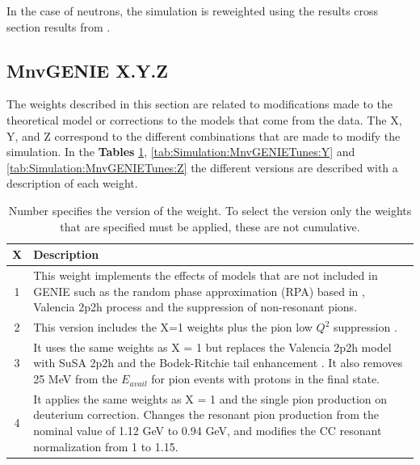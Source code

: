 In the case of neutrons, the simulation is reweighted using the results cross section results from \cite{ElkinsNeutronsPhysRevD.100.052002}.

\subsection{MnvGENIE X.Y.Z}
\label{Cap:Simulation:MnvGENIETunes:MnvTunesXYZ}
The weights described in this section are related to modifications made to the theoretical model or corrections to the models that come from the data. The X, Y, and Z correspond to the different combinations that are made to modify the simulation. 
In the \textbf{Tables} \ref{tab:Simulation:MnvGENIETunes:X}, \ref{tab:Simulation:MnvGENIETunes:Y} and \ref{tab:Simulation:MnvGENIETunes:Z} the different versions are described with a description of each weight. 

\begin{table}[!htb]
    \centering
    \begin{tabular}{c|p{4.5in}}
        \textbf{X} & \textbf{Description} \\ \hline
        1 & This weight implements the effects of models that are not included in GENIE such as the random phase approximation (RPA) based in \cite{RPAPhysRevC.70.055503}\cite{RPAgran2017model}, Valencia 2p2h process \cite{2p2hPhysRevC.83.045501}\cite{2p2hGran_2013}\cite{2p2hRodrigues_2016} and the suppression of non-resonant pions\cite{Rodrigues_2016}. \\ \hline
        2 & This version includes the X=1 weights plus the pion low $Q^2$ suppression \cite{LowQ2PhysRevD.100.072005}.  \\ \hline
        3 & It uses the same weights as X = 1 but replaces the Valencia 2p2h model with SuSA 2p2h \cite{SuSAPhysRevC.38.1801} and the Bodek-Ritchie tail enhancement \cite{Alvarez_Ruso_2021}. It also removes 25 MeV from the $E_{avail}$ for pion events with protons in the final state. \\ \hline
        4 & It applies the same weights as X = 1 and the single pion production on deuterium correction. Changes the resonant pion production from the nominal value of 1.12 GeV to 0.94 GeV, and modifies the CC resonant normalization from 1 to 1.15.  \\ 
    \end{tabular}
    \caption{Number specifies the version of the weight. To select the version only the weights that are specified must be applied, these are not cumulative. }
    \label{tab:Simulation:MnvGENIETunes:X}
\end{table}


